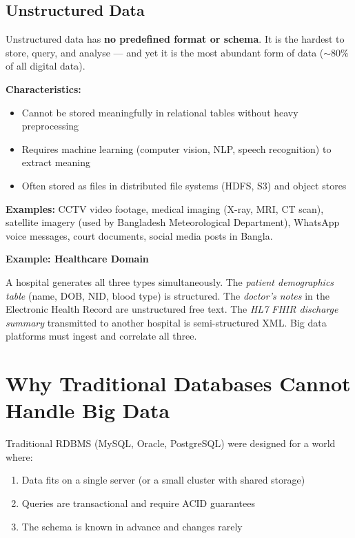 \documentclass[12pt,a4paper]{article}
\newcommand{\examplebox}[2]{%
  \noindent
  \colorbox{PUTeal!10}{%
    \begin{minipage}{\dimexpr\linewidth-2\fboxsep}
      \vspace{4pt}
      \textbf{\textcolor{PUTeal}{Example: #1}}\par\vspace{2pt}
      #2
      \vspace{4pt}
    \end{minipage}%
  }\par\vspace{6pt}%
}
\begin{document}
\subsection{Unstructured Data}

Unstructured data has \textbf{no predefined format or schema}. It is the hardest to store, query, and analyse — and yet it is the most abundant form of data ($\sim$80\% of all digital data).

\textbf{Characteristics:}
\begin{itemize}[leftmargin=1.8em]
  \item Cannot be stored meaningfully in relational tables without heavy preprocessing
  \item Requires machine learning (computer vision, NLP, speech recognition) to extract meaning
  \item Often stored as files in distributed file systems (HDFS, S3) and object stores
\end{itemize}

\textbf{Examples:} CCTV video footage, medical imaging (X-ray, MRI, CT scan), satellite imagery (used by Bangladesh Meteorological Department), WhatsApp voice messages, court documents, social media posts in Bangla.

\examplebox{Healthcare Domain}{A hospital generates all three types simultaneously. The \textit{patient demographics table} (name, DOB, NID, blood type) is structured. The \textit{doctor's notes} in the Electronic Health Record are unstructured free text. The \textit{HL7 FHIR discharge summary} transmitted to another hospital is semi-structured XML. Big data platforms must ingest and correlate all three.}

\section{Why Traditional Databases Cannot Handle Big Data}

Traditional RDBMS (MySQL, Oracle, PostgreSQL) were designed for a world where:
\begin{enumerate}[leftmargin=2em]
  \item Data fits on a single server (or a small cluster with shared storage)
  \item Queries are transactional and require ACID guarantees
  \item The schema is known in advance and changes rarely
\end{enumerate}
\end{document}
